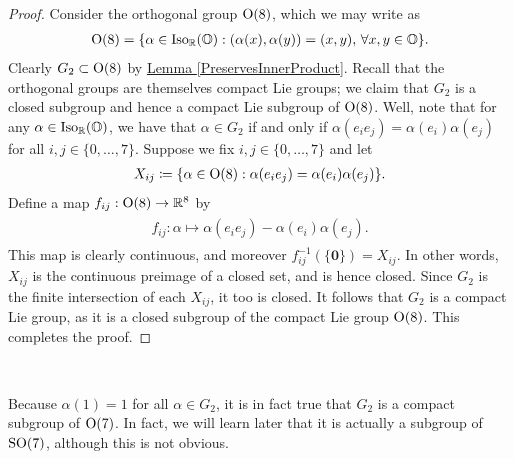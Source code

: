 \noindent\begin{proof} Consider the orthogonal group $\textup{O}(8)$, which we may write as
\begin{align*}
\begin{split}
\textup{O}(8) = \{\alpha \in \textup{Iso}_\mathbb{R}(\mathbb{O}) : (\alpha(x), \alpha(y)) = (x, y),\ \!\forall x, y \in \mathbb{O}\}.
\end{split}
\end{align*}
\noindent Clearly $G_2 \subset \textup{O}(8)$ by \hyperref[PreservesInnerProduct]{Lemma \ref*{PreservesInnerProduct}}. Recall that the orthogonal groups are themselves compact Lie groups; we claim that $G_2$ is a closed subgroup and hence a compact Lie subgroup of $\textup{O}(8)$. Well, note that for any $\alpha \in \textup{Iso}_\mathbb{R}(\mathbb{O})$, we have that $\alpha \in G_2$ if and only if $\alpha(e_ie_j) = \alpha(e_i)\alpha(e_j)$ for all $i, j \in \{0, \dots, 7\}$. Suppose we fix $i, j \in \{0, \dots, 7\}$ and let
\begin{align*}
\begin{split}
X_{ij} \coloneqq \{\alpha \in \textup{O}(8) : \alpha(e_ie_j) = \alpha(e_i)\alpha(e_j)\}.
\end{split}
\end{align*}
\noindent Define a map $f_{ij} : \textup{O}(8) \to \mathbb{R}^8$ by
\begin{align*}
\begin{split}
f_{ij} : \alpha \mapsto \alpha(e_ie_j) - \alpha(e_i)\alpha(e_j).
\end{split}
\end{align*}
\noindent This map is clearly continuous, and moreover $f_{ij}^{-1}(\{\boldsymbol{0}\}) = X_{ij}$. In other words, $X_{ij}$ is the continuous preimage of a closed set, and is hence closed. Since $G_2$ is the finite intersection of each $X_{ij}$, it too is closed. It follows that $G_2$ is a compact Lie group, as it is a closed subgroup of the compact Lie group $\textup{O}(8)$. This completes the proof.
\end{proof}\\

\noindent\begin{remark} Because $\alpha(1) = 1$ for all $\alpha \in G_2$, it is in fact true that $G_2$ is a compact subgroup of $\textup{O}(7)$. In fact, we will learn later that it is actually a subgroup of $\textup{SO}(7)$, although this is not obvious.\\
\end{remark}

